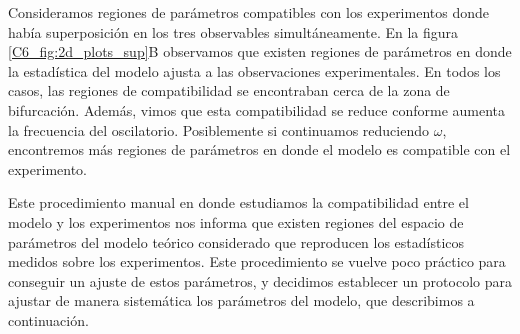 \documentclass[./main.tex]{subfiles}
\begin{document}
Consideramos regiones de parámetros compatibles con los experimentos donde había superposición en los tres observables simultáneamente. En la figura \ref{C6_fig:2d_plots_sup}B observamos que existen regiones de parámetros en donde la estadística del modelo ajusta a las observaciones experimentales. En todos los casos, las regiones de compatibilidad se encontraban cerca de la zona de bifurcación. Además, vimos que esta compatibilidad se reduce conforme aumenta la frecuencia del oscilatorio. Posiblemente si continuamos reduciendo $\omega$, encontremos más regiones de parámetros en donde el modelo es compatible con el experimento. 


Este procedimiento manual en donde estudiamos la compatibilidad entre el modelo y los experimentos nos informa que existen regiones del espacio de parámetros del modelo teórico considerado que reproducen los estadísticos medidos sobre los experimentos. Este procedimiento se vuelve poco práctico para conseguir un ajuste de estos parámetros, y decidimos establecer un protocolo para ajustar de manera sistemática los parámetros del modelo, que describimos a continuación. 
\end{document}
